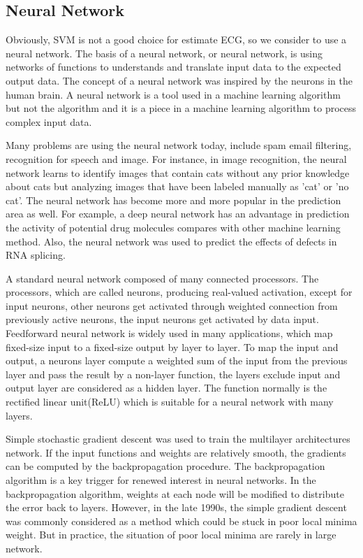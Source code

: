 \documentclass[a4paper,12pt]{article}
\begin{document}
\subsection{Neural Network}
Obviously, SVM is not a good choice for estimate ECG, so we consider to use a neural network. The basis of a neural network, or neural network, is using networks of functions to understands and translate input data to the expected output data. The concept of a neural network was inspired by the neurons in the human brain. A neural network is a tool used in a machine learning algorithm but not the algorithm and it is a piece in a machine learning algorithm to process complex input data\parencite{Build}. 

Many problems are using the neural network today, include spam email filtering, recognition for speech and image. For instance, in image recognition, the neural network learns to identify images that contain cats without any prior knowledge about cats but analyzing images that have been labeled manually as 'cat' or 'no cat'\parencite{wiki:neuralnetwork}. The neural network has become more and more popular in the prediction area as well. For example, a deep neural network has an advantage in prediction the activity of potential drug molecules compares with other machine learning method\parencite{Ma:2015deep}. Also, the neural network was used to predict the effects of defects in RNA splicing\parencite{Xiong:2015human}.

A standard neural network composed of many connected processors. The processors, which are called neurons,  producing real-valued activation, except for input neurons, other neurons get activated through weighted connection from previously active neurons, the input neurons get activated by data input\parencite{Schmidhuber:2015deep}. Feedforward neural network is widely used in many applications, which map fixed-size input to a fixed-size output by layer to layer\parencite{Lecun:2015deep}. To map the input and output, a neurons layer compute a weighted sum of the input from the previous layer and pass the result by a non-layer function, the layers exclude input and output layer are considered as a hidden layer. The function normally is the rectified linear unit(ReLU) which is suitable for a neural network with many layers. 

Simple stochastic gradient descent was used to train the multilayer architectures network. If the input functions and weights are relatively smooth, the gradients can be computed by the backpropagation procedure\parencite{Lecun:2015deep}. The backpropagation algorithm is a key trigger for renewed interest in neural networks\parencite{wiki:neuralnetwork}. In the backpropagation algorithm, weights at each node will be modified to distribute the error back to layers. However, in the late 1990s, the simple gradient descent was commonly considered as a method which could be stuck in poor local minima weight\parencite{Lecun:2015deep}. But in practice, the situation of poor local minima are rarely in large network\parencite{Lecun:2015deep}.
\end{document}
